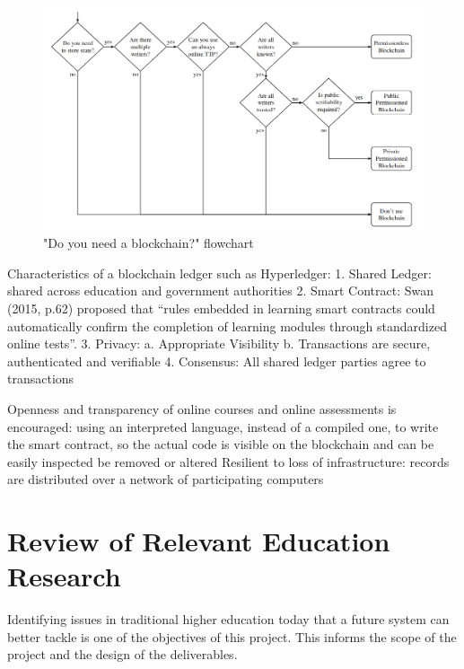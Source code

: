\begin{figure}[!ht] 
    \centering    
    \includegraphics[width=1.0\textwidth]{blockchain_need}
    \caption["Do you need a blockchain?" flowchart]
        {"Do you need a blockchain?" flowchart \citep[p.3]{wust2017you}}
    \label{fig:LTSA}
\end{figure}


Characteristics of a blockchain ledger such as Hyperledger:
1. Shared Ledger: 
shared across education and government authorities
2. Smart Contract: 
Swan (2015, p.62) proposed that “rules embedded in learning smart contracts could automatically confirm the completion of learning modules 
through standardized online tests”.
3. Privacy: 
a. Appropriate Visibility
b. Transactions are secure, authenticated and verifiable
4. Consensus: All shared ledger parties agree to transactions

Openness and transparency of online courses and online assessments is encouraged: using an interpreted language, instead of a compiled 
one, to write the smart contract, so the actual code is visible on the blockchain and can be easily inspected
be removed or altered
Resilient to loss of infrastructure: records are distributed over a network of participating computers

\section{Review of Relevant Education Research}

Identifying issues in traditional higher education today that a future system can better 
tackle is one of the objectives of this project. This informs the scope of the 
project and the design of the deliverables.


